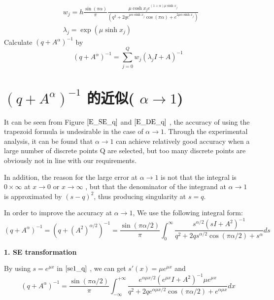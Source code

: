 \begin{algorithm}[!h]
\begin{algorithmic}[1]
		\begin{equation*}
			\begin{aligned}
				&w_j=h\frac{\sin(\pi \alpha)}{\pi}\frac{\mu\cosh x_j e^{(1+\alpha)\mu\sinh x_j }}{(q^2+2q e^{\mu \alpha \sinh x_j}\cos(\pi\alpha)+e^{2\mu\alpha\sinh x_j})}\\
				&\lambda_j=\exp(\mu\sinh x_j)
			\end{aligned}
		\end{equation*}
		\ENDIF
		\STATE  Calculate $(q+A^{\alpha})^{-1}$ by 
		\begin{equation}
			(q+{A}^{\alpha})^{-1}=\sum_{j=0}^{Q}w_j(\lambda_jI+A)^{-1}
		\end{equation}
	\end{algorithmic}
\end{algorithm}


\section{$(q+A^{\alpha})^{-1}$ 的近似( $\alpha \rightarrow 1$)}

It can be seen from  Figure $\ref{E_SE_q}$ and $\ref{E_DE_q}$ , the accuracy of using the trapezoid formula is undesirable in the case of $\alpha \rightarrow 1$. Through the experimental analysis, it can be found that $\alpha \rightarrow 1$ can achieve relatively good accuracy when a large number of discrete points Q are selected, but too many discrete points are obviously not in line with our requirements.

In addition, the reason for the large error at $\alpha \rightarrow 1$ is not that the integral is $0 \times \infty$ at $x \rightarrow 0$ or $x \rightarrow \infty$ , but that the denominator of the integrand at $\alpha \rightarrow 1$ is approximated by $(s-q)^{2}$, thus producing singularity at $s=q$.

In order to improve the accuracy at $\alpha \rightarrow 1$, We use the following integral form:
\begin{equation}
		(q+A^{\alpha})^{-1}=(q+(A^2)^{\alpha/2})^{-1}
		=\frac{\sin(\pi \alpha /2)}{\pi}\int_0^{\infty}\frac{s^{\alpha/2}(sI+A^2)^{-1}}{q^2+2qs^{\alpha/2}\cos(\pi \alpha/2)+s^{\alpha}}ds	
	\label{se1_q}
\end{equation}


\textbf{1. SE transformation}

By using  $s=e^{\mu x}$ in $\eqref{se1_q}$  , we can get $s'(x)=\mu e^{\mu x}$ and
\begin{equation}
	(q+{A}^{\alpha})^{-1}=\frac{\sin(\pi \alpha/2)}{\pi}\int_{-\infty}^{+\infty}\frac{e^{\alpha\mu x/2}(e^{\mu x} I+A^2)^{-1}\mu e^{\mu x}}{q^2+2qe^{\alpha\mu x/2}\cos(\pi\alpha/2)+e^{\alpha\mu x}} dx
	\label{expu_se1_q}
\end{equation}

